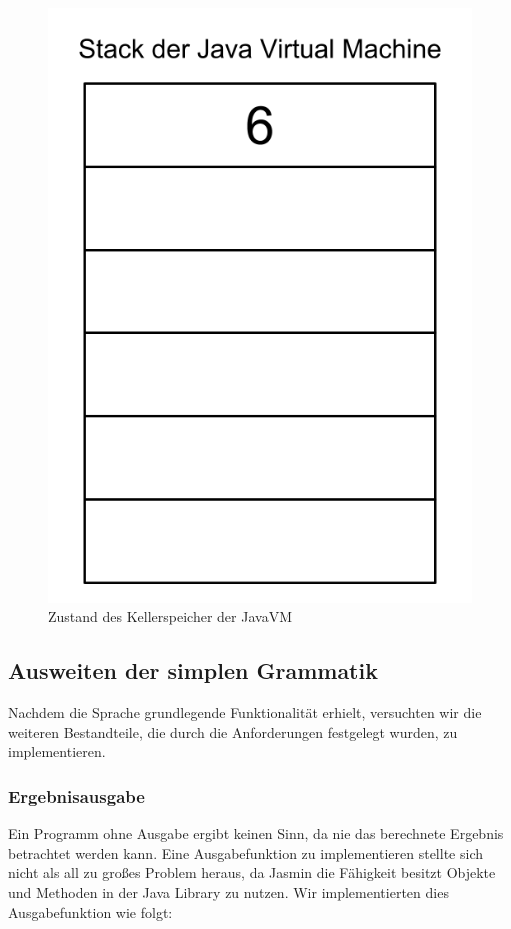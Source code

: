 \begin{figure}[h!]
\centering
\includegraphics[scale=0.2]{pics/stack_visual(3).png}
\caption{Zustand des Kellerspeicher der JavaVM}
\label{fig:method}
\end{figure}



\pagebreak

\subsection{Ausweiten der simplen Grammatik}
Nachdem die Sprache grundlegende Funktionalität erhielt, versuchten wir die weiteren Bestandteile, die durch die Anforderungen festgelegt wurden, zu implementieren. 


\subsubsection{Ergebnisausgabe}
Ein Programm ohne Ausgabe ergibt keinen Sinn, da nie das berechnete Ergebnis betrachtet werden kann. Eine Ausgabefunktion zu implementieren stellte sich nicht als all zu großes Problem heraus, da Jasmin die Fähigkeit besitzt Objekte und Methoden in der Java Library zu nutzen. Wir implementierten dies Ausgabefunktion wie folgt:


